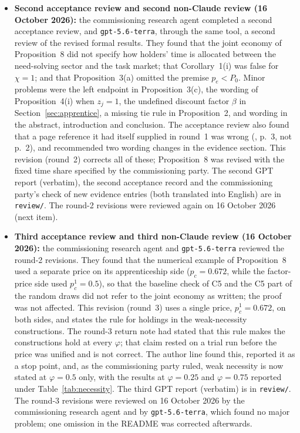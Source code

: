\documentclass[12pt]{article}
\theoremstyle{remark}
\begin{document}
\begin{itemize}[itemsep=1pt]
\item \textbf{Second acceptance review and second non-Claude review (16 October 2026):} the commissioning research agent completed a second acceptance review, and \texttt{gpt-5.6-terra}, through the same tool, a second review of the revised formal results. They found that the joint economy of Proposition~8 did not specify how holders' time is allocated between the need-solving sector and the task market; that Corollary~1(i) was false for $\chi=1$; and that Proposition~3(a) omitted the premise $p_e<P_0$. Minor problems were the left endpoint in Proposition~3(c), the wording of Proposition~4(i) when $z_j=1$, the undefined discount factor $\beta$ in Section~\ref{sec:apprentice}, a missing tie rule in Proposition~2, and wording in the abstract, introduction and conclusion. The acceptance review also found that a page reference it had itself supplied in round~1 was wrong (\citealp{korom2025penda}, p.~3, not p.~2), and recommended two wording changes in the evidence section. This revision (round~2) corrects all of these; Proposition~8 was revised with the fixed time share specified by the commissioning party. The second GPT report (verbatim), the second acceptance record and the commissioning party's check of new evidence entries (both translated into English) are in \texttt{review/}. The round-2 revisions were reviewed again on 16 October 2026 (next item).
\item \textbf{Third acceptance review and third non-Claude review (16 October 2026):} the commissioning research agent and \texttt{gpt-5.6-terra} reviewed the round-2 revisions. They found that the numerical example of Proposition~8 used a separate price on its apprenticeship side ($p_c=0.672$, while the factor-price side used $p_c^1=0.5$), so that the baseline check of C5 and the C5 part of the random draws did not refer to the joint economy as written; the proof was not affected. This revision (round~3) uses a single price, $p_c^1=0.672$, on both sides, and states the rule for holdings in the weak-necessity constructions. The round-3 return note had stated that this rule makes the constructions hold at every $\varphi$; that claim rested on a trial run before the price was unified and is not correct. The author line found this, reported it as a stop point, and, as the commissioning party ruled, weak necessity is now stated at $\varphi=0.5$ only, with the results at $\varphi=0.25$ and $\varphi=0.75$ reported under Table~\ref{tab:necessity}. The third GPT report (verbatim) is in \texttt{review/}. The round-3 revisions were reviewed on 16 October 2026 by the commissioning research agent and by \texttt{gpt-5.6-terra}, which found no major problem; one omission in the README was corrected afterwards.

\end{itemize}
\end{document}
